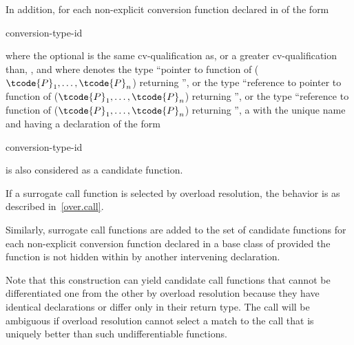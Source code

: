 \pnum
In addition, for each non-explicit conversion function declared in  of the
form
\begin{ncsimplebnf}
 conversion-type-id \terminal{(\,)}     \terminal{;}
\end{ncsimplebnf}
where the optional
is the same cv-qualification as, or a greater cv-qualification than,
\cv{},
and where
denotes the type ``pointer to function
of ($\tcode{P}_1, \dotsc, \tcode{P}_n$) returning '',
or the type ``reference to pointer to function
of ($\tcode{P}_1, \dotsc, \tcode{P}_n$) returning '',
or the type
``reference to function of ($\tcode{P}_1, \dotsc, \tcode{P}_n$)
returning '', a  with the unique name
and having a declaration of the form
\begin{ncbnf}
  \terminal{(} conversion-type-id \ %
\end{ncbnf}
is also considered as a candidate function.
\begin{note}
If a surrogate call function is selected by overload resolution,
the behavior is as described in~\ref{over.call}.
\end{note}
Similarly, surrogate
call functions are added to the set of candidate functions for
each non-explicit conversion function declared in a base class of
provided the function is not hidden within
by another
intervening declaration.
\begin{footnote}
Note that this construction can yield
candidate call functions that cannot be
differentiated one from the other by overload resolution because they have
identical
declarations or differ only in their return type.
The call will be ambiguous
if overload
resolution cannot select a match to the call that is uniquely better than such
undifferentiable functions.
\end{footnote}

